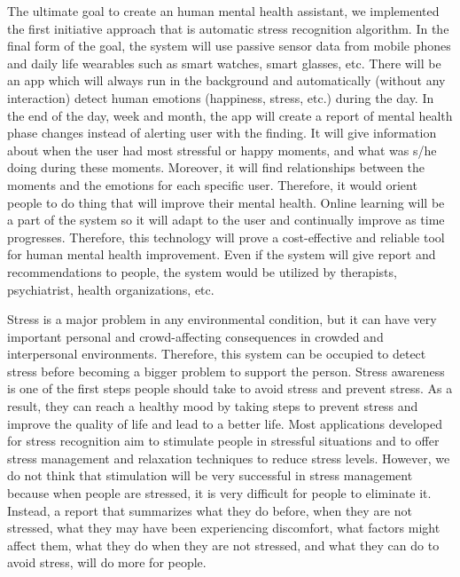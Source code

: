 \documentclass[12pt,oneandhalf,chaparabic,lfm,phd,eng,oneside,pntc]{gsufbe}
\begin{document}
The ultimate goal to create an human mental health assistant, we implemented the first initiative approach that is automatic stress recognition algorithm. In the final form of the goal, the system will use passive sensor data from mobile phones and daily life wearables such as smart watches, smart glasses, etc. There will be an app which will always run in the background and automatically (without any interaction) detect human emotions (happiness, stress, etc.) during the day. In the end of the day, week and month, the app will create a report of mental health phase changes instead of alerting user with the finding. It will give information about when the user had most stressful or happy moments, and what was s/he doing during these moments. Moreover, it will find relationships between the moments and the emotions for each specific user. Therefore, it would orient people to do thing that will improve their mental health. Online learning will be a part of the system so it will adapt to the user and continually improve as time progresses. Therefore, this technology will prove a cost-effective and reliable tool for human mental health improvement. Even if the system will give report and recommendations to people, the system would be utilized by therapists, psychiatrist, health organizations, etc. 

Stress is a major problem in any environmental condition, but it can have very important personal and crowd-affecting consequences in crowded and interpersonal environments. Therefore, this system can be occupied to detect stress before becoming a bigger problem to support the person. Stress awareness is one of the first steps people should take to avoid stress and prevent stress. As a result, they can reach a healthy mood by taking steps to prevent stress and improve the quality of life and lead to a better life. Most applications developed for stress recognition aim to stimulate people in stressful situations and to offer stress management and relaxation techniques to reduce stress levels. However, we do not think that stimulation will be very successful in stress management because when people are stressed, it is very difficult for people to eliminate it. Instead, a report that summarizes what they do before, when they are not stressed, what they may have been experiencing discomfort, what factors might affect them, what they do when they are not stressed, and what they can do to avoid stress, will do more for people.
\end{document}
